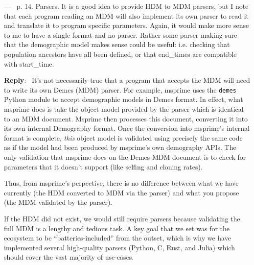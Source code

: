\documentclass[11pt]{article}
\newcounter{reviewer}
\newcounter{point}[reviewer]
\renewcommand{\thepoint}{\thereviewer.\arabic{point}}
\newenvironment{point}
   {\refstepcounter{point} \bigskip \noindent {\textbf{Reviewer~Point~\thepoint} } ---\ }
   {\par }
\newenvironment{reply}
   {\medskip \noindent \begin{sf}\textbf{Reply}:\  }
   {\medskip \end{sf}}
\begin{document}
\begin{point}
p. 14. Parsers. It is a good idea to provide HDM to MDM parsers, but I note
  that each program reading an MDM will also implement its own parser to read
it and translate it to program specific parameters. Again, it would make more
sense to me to have a single format and no parser. Rather some parser making
sure that the demographic model makes sense could be useful: i.e. checking that
population ancestors have all been defined, or that end\_times are compatible
with start\_time.
\end{point}
\begin{reply}
It's not necessarily true that a program that accepts the MDM will need to
write its own Demes (MDM) parser. For example, msprime uses the \texttt{demes}
Python module to accept demographic models in Demes format. In effect,
what msprime does is take the object model provided by the parser
which is identical to an MDM document. Msprime then processes this document,
converting it into its own internal Demography format. Once the conversion
into msprime's internal format is complete, \emph{this} object
model is validated using precisely the same code as if the model
had been produced by msprime's own demography APIs.
The only validation that msprime does on the Demes MDM document
is to check for parameters that it doesn't support (like selfing and cloning
rates).

Thus, from msprime's perpective, there is no difference between what we
have currently (the HDM converted to MDM via the parser) and what
you propose (the MDM validated by the parser).

If the HDM did not exist, we would still require parsers because validating
the full MDM is a lengthy and tedious task.
A key goal that we set was for the ecosystem to be ``batteries-included''
from the outset, which is why we have implemented several high-quality
parsers (Python, C, Rust, and Julia) which should
cover the vast majority of use-cases.
\end{reply}
\end{document}
